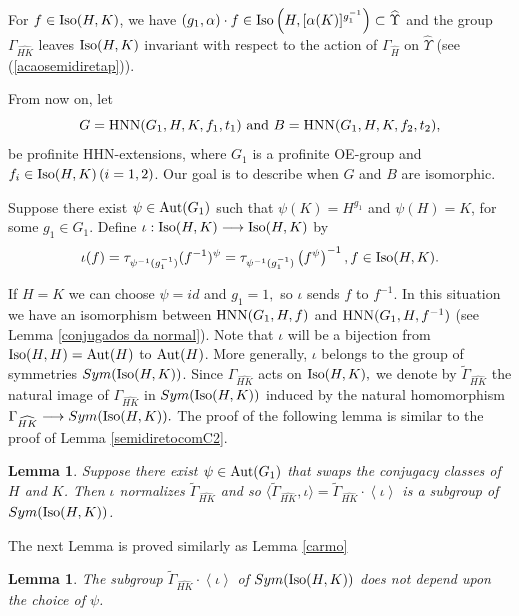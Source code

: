 \documentclass[a4paper,12pt]{article}
\newtheorem{lem}[thm]{Lemma}
\def\aut {{\rm Aut}}
\def\hnn {{\rm HNN}}
\def\Iso {{\rm Iso}}
\begin{document}
{ 
  For $f\in \Iso(H, K)$, we have $(g_1,\alpha) \cdot f \in \Iso\left(H, [\alpha(K)]^{g_1^{-1}}\right) \subset \widehat \Upsilon$ and
the group $\Gamma_{\widehat{HK}}$ leaves $\Iso(H, K)$ invariant with respect  to the action of $\Gamma_{\widehat{H}}$ on $\widehat\Upsilon$ (see (\ref{acaosemidiretap})).  

From now on, let $$G=\hnn(G_1, H, K, f_1, t_1) \mbox{ and } B=\hnn(G_1, H, K, f_2, t_2),$$ be profinite HHN-extensions, where $G_1$ is a profinite OE-group and \break $f_i \in \Iso(H, K)\,(i=1,2)$. Our goal is to describe  when $G$ and $B$ are isomorphic. 


Suppose there exist $\psi \in \aut(G_1)$ such that $\psi(K)=H^{g_1}$ and $\psi(H)=K$, for some $g_1\in G_1$.  Define $\iota: \Iso(H,K) \longrightarrow \Iso(H,K)$ by \begin{equation} \label{def iota prof} \iota(f)=\tau_{\psi^{-1}(g_1^{-1})}(f^{-1})^{\psi}=\tau_{\psi^{-1}(g_1^{-1})} \left(f^{\psi}\right)^{-1}, f \in \Iso(H,K).\end{equation} 



If $H=K$ we can choose $\psi=id$ and $g_1=1,$ so $\iota$ sends $f$ to $f^{-1}.$ In this situation we have an isomorphism between $\hnn(G_1,H,f)$ and $\hnn(G_1,H,f^{-1})$ (see Lemma \ref{conjugados da normal}). Note that $\iota$ will be a bijection from $\Iso(H, H)=\aut(H)$ to $\aut(H)$. More generally, $\iota$ belongs to the group of symmetries $Sym(\Iso(H, K))$. Since $\Gamma_{\widehat{HK}}$ acts on $\Iso(H, K),$ we  denote by  $\widetilde\Gamma_{\widehat{HK}}$ the natural image of $\Gamma_{\widehat{HK}}$ in $Sym(\Iso(H, K))$ induced by the natural homomorphism $\Gamma_{\widehat{HK}} \longrightarrow Sym(\Iso(H, K)).$ The proof of the following lemma is similar to the proof of Lemma 
\ref{semidiretocomC2}. 

\begin{lem} \label{semidiretocomC2p}  Suppose there exist $\psi \in \aut(G_1)$ that swaps the conjugacy classes of $H$ and $K$.  Then $\iota $ normalizes $\widetilde\Gamma_{\widehat{HK}}$ and so $\langle \widetilde\Gamma_{\widehat{HK}}, \iota  \rangle=\widetilde\Gamma_{\widehat{HK}} \cdot  \left\langle  \iota \right\rangle$ is a subgroup of $Sym(\Iso(H, K))$.   

\end{lem}  


The next Lemma is proved similarly as Lemma \ref{carmo}

\begin{lem}\label{carmoprof} The subgroup $\widetilde\Gamma_{\widehat{HK}} \cdot  \left\langle  \iota \right\rangle$ of $Sym(\Iso(H, K))$ does not depend upon the choice of $\psi$.
\end{lem}

}
\end{document}
